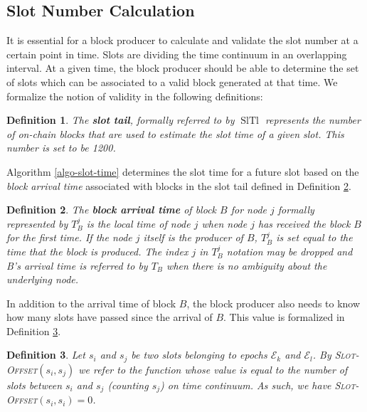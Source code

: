 \documentclass{book}
\newcommand{\tmem}[1]{{\em #1\/}}
\newcommand{\tmname}[1]{\textsc{#1}}
\newcommand{\tmop}[1]{\ensuremath{\operatorname{#1}}}
\newcommand{\tmstrong}[1]{\textbf{#1}}
\newcommand{\tmverbatim}[1]{{\ttfamily{#1}}}
\newtheorem{definition}{Definition}
\newtheorem{definition}{Definition}
\begin{document}
\subsection{Slot Number Calculation}

It is essential for a block producer to calculate and validate the slot number
at a certain point in time. Slots are dividing the time continuum in an
overlapping interval. At a given time, the block producer should be able to
determine the set of slots which can be associated to a valid block generated
at that time. We formalize the notion of validity in the following
definitions:

\begin{definition}
  \label{slot-time-cal-tail}The {\tmstrong{slot tail}}, formally referred to
  by $\tmop{SlTl}$ represents the number of on-chain blocks that are used to
  estimate the slot time of a given slot. This number is set to be 1200.
\end{definition}

Algorithm \ref{algo-slot-time} determines the slot time for a future slot
based on the {\tmem{block arrival time}} associated with blocks in the slot
tail defined in Definition \ref{defn-block-time}.

\begin{definition}
  \label{defn-block-time}The {\tmstrong{block arrival time}} of block $B$ for
  node $j$ formally represented by {\tmstrong{$T^j_B$}} is the local time
  of\tmverbatim{} node $j$ when node $j$ has received the block $B$ for the
  first time. If the node $j$ itself is the producer of $B$, $T_B^j$ is set
  equal to the time that the block is produced. The index $j$ in $T^j_B$
  notation may be dropped and B's arrival time is referred to by $T_B$ when
  there is no ambiguity about the underlying node.
\end{definition}

In addition to the arrival time of block $B$, the block producer also needs to
know how many slots have passed since the arrival of $B$. This value is
formalized in Definition \ref{defn-slot-offset}.

\begin{definition}
  \label{defn-slot-offset}Let $s_i$ and $s_j$ be two slots belonging to epochs
  $\mathcal{E}_k$ and $\mathcal{E}_l$. By {\tmname{Slot-Offset}}$(s_i, s_j)$
  we refer to the function whose value is equal to the number of slots between
  $s_i$ and $s_j$ (counting $s_j$) on time continuum. As such, we have
  {\tmname{Slot-Offset}}$(s_i, s_i) = 0$.
\end{definition}
\end{document}
